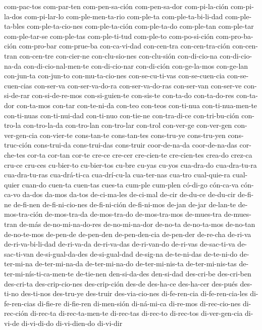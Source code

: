 {com-pac-tos com-par-ten com-pen-sa-ción com-pen-sa-dor com-pi-la-ción com-pi-la-dos
com-pi-lar-lo com-ple-men-ta-rio com-ple-ta com-ple-ta-bi-li-dad com-ple-ta-bles
com-ple-ta-cio-nes com-ple-ta-ción com-ple-ta-do com-ple-tan com-ple-tar com-ple-tar-se
com-ple-tas com-ple-ti-tud com-ple-to com-po-si-ción com-pro-ba-ción com-pro-bar com-prue-ba
con-ca-vi-dad con-cen-tra con-cen-tra-ción con-cen-tran con-cen-tre con-cier-ne
con-clu-sio-nes con-clu-sión con-di-cio-na con-di-cio-na-da con-di-cio-nal-men-te
con-di-cio-nar con-di-ción con-ge-la-mos con-ge-lan con-jun-ta con-jun-to con-mu-ta-cio-nes
con-se-cu-ti-vas con-se-cuen-cia con-se-cuen-cias con-ser-va con-ser-va-do-ra
con-ser-va-do-ras con-ser-van con-ser-ve con-si-de-rar con-si-de-re-mos con-si-guien-te
con-sis-te con-ta-do con-ta-do-res con-ta-dor con-ta-mos con-tar con-te-ni-da con-teo
con-teos con-ti-nua con-ti-nua-men-te con-ti-nuas con-ti-nui-dad con-ti-nuo con-tie-ne
con-tra-di-ce con-tri-bu-ción con-tro-la con-tro-la-da con-tro-lan con-tro-lar con-trol
con-ver-ge con-ver-gen con-ver-gen-cia con-vier-te cons-tan-te cons-tan-tes cons-tru-ye
cons-tru-yen cons-truc-ción cons-trui-da cons-trui-das cons-truir coor-de-na-da
coor-de-na-das cor-che-tes cor-ta cor-tan cor-te cre-ce cre-cer cre-cien-te cre-cien-tes
crea-do crez-ca cru-ce cru-ces cu-bier-to cu-bier-tos cu-bre cu-yas cu-yos cua-dra-do
cua-dra-tu-ra cua-dra-tu-ras cua-drá-ti-ca cua-drí-cu-la cua-ter-nas cua-tro cual-quie-ra
cual-quier cuan-do cuen-ta cuen-tas cues-ta cum-ple cum-plen có-di-go cón-ca-va cón-ca-vo
da-dos da-mos da-tos de-ci-ma-les de-ci-mal de-cir de-du-ce de-du-cir de-fi-ne de-fi-nen
de-fi-ni-cio-nes de-fi-ni-ción de-fi-ni-mos de-jan de-jar de-lan-te de-mos-tra-ción
de-mos-tra-da de-mos-tra-do de-mos-tra-mos de-mues-tra de-mues-tran de-más
de-no-mi-na-do-res de-no-mi-na-dor de-no-ta de-no-ta-mos de-no-tan de-no-te-mos de-pen-de
de-pen-den de-pen-den-cia de-pen-der de-re-cha de-ri-va de-ri-va-bi-li-dad de-ri-va-da
de-ri-va-das de-ri-van-do de-ri-vas de-sac-ti-va de-sac-ti-van de-si-gual-da-des
de-si-gual-dad de-sig-na de-te-ni-das de-te-ni-do de-ter-mi-na de-ter-mi-na-da
de-ter-mi-na-do de-ter-mi-nis-ta de-ter-mi-nis-tas de-ter-mi-nís-ti-ca-men-te de-tie-nen
den-si-da-des den-si-dad des-cri-be des-cri-ben des-cri-ta des-crip-cio-nes des-crip-ción
des-de des-ha-ce des-ha-cer des-pués des-ti-no des-ti-nos des-tru-ye des-truir
des-via-cio-nes di-fe-ren-cia di-fe-ren-cia-les di-fe-ren-cias di-fie-re di-fie-ren
di-men-sión di-ná-mi-ca di-re-mos di-rec-cio-nes di-rec-ción di-rec-ta di-rec-ta-men-te
di-rec-tas di-rec-to di-rec-tos di-ver-gen-cia di-vi-de di-vi-di-do di-vi-dien-do di-vi-dir
}
